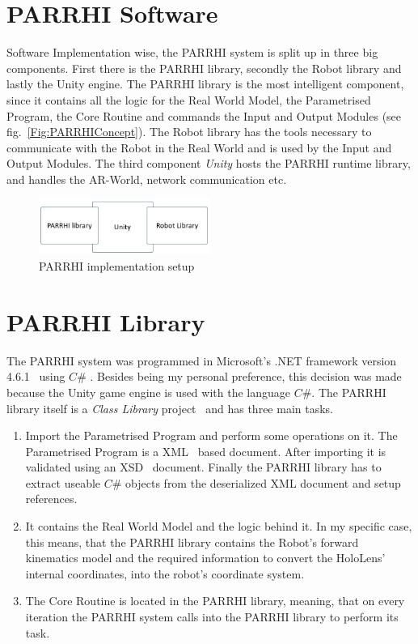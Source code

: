 \section{PARRHI Software}
Software Implementation wise, the PARRHI system is split up in three big components. First there is the PARRHI library, secondly the Robot library and lastly the Unity engine. The PARRHI library is the most intelligent component, since it contains all the logic for the Real World Model, the Parametrised Program, the Core Routine and commands the Input and Output Modules (see fig.~\ref{Fig:PARRHIConcept}). The Robot library has the tools necessary to communicate with the Robot in the Real World and is used by the Input and Output Modules. The third component \textit{Unity} hosts the PARRHI runtime library, and handles the AR-World, network communication etc.


\begin{figure}[!h]
	\centering
	\includegraphics[width=0.5\textwidth]{Figures/Implementation_SystemSetup.jpg}
	\caption{PARRHI implementation setup}
	\label{Fig:Implementation}
\end{figure}


\section{PARRHI Library}
The PARRHI system was programmed in Microsoft's .NET framework version 4.6.1~\cite{NETFramework} using $C\#$ \cite{CSharp}. Besides being my personal preference, this decision was made because the Unity game engine is used with the language $C\#$. The PARRHI library itself is a \textit{Class Library} project~\cite{ClassLibrary} and has three main tasks.

\begin{enumerate}
	\item Import the Parametrised Program and perform some operations on it. The Parametrised Program is a XML~\cite{xmlW3C} based document. After importing it is validated using an XSD~\cite{xsdW3C} document. Finally the PARRHI library has to extract useable $C\#$ objects from the deserialized XML document and setup references.
	\item It contains the Real World Model and the logic behind it. In my specific case, this means, that the PARRHI library contains the Robot's forward kinematics model and the required information to convert the HoloLens' internal coordinates, into the robot's coordinate system.
	\item The Core Routine is located in the PARRHI library, meaning, that on every iteration the PARRHI system calls into the PARRHI library to perform its task.
\end{enumerate}

